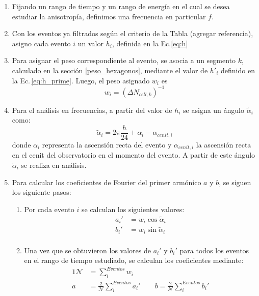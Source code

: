         \begin{enumerate}
        \item Fijando un rango de tiempo y un rango de energía en el cual se desea estudiar la anisotropía, definimos  una frecuencia en particular $f$.

        \item Con los eventos ya filtrados según el criterio de la Tabla (agregar referencia), asigno cada evento $i$ un valor $h_i$, definida en la Ec.\ref{eq:h}

        \item Para asignar el peso correspondiente al evento, se asocia a un segmento $k$, calculado en la sección  \ref{peso_hexagonos}, mediante el valor de $h'_i$ definido en la Ec.\,\ref{eq:h_prime}. Luego, el peso asignado $w_i$ es
        \begin{equation*}
           w_{i}= (\Delta N_{cell,k})^{-1}
        \end{equation*} 
         
        \item Para el análisis en frecuencias, a partir del valor de $h_i$ se asigna un ángulo $\tilde{\alpha}_i$ como:
        \begin{equation}
         \tilde{\alpha}_i = 2\pi \frac{h}{24} + \alpha_i -\alpha_{cenit,i}
        \end{equation}
        donde $\alpha_i$  representa la ascensión recta del evento y $\alpha_{cenit,i}$ la ascensión recta en el cenit del observatorio en el momento del evento. A partir de este ángulo $\tilde{\alpha}_i$ se realiza en análisis.

         \item Para calcular los coeficientes de Fourier del primer armónico $a$ y $b$, se siguen los siguiente pasos:

        \begin{enumerate}
          \item Por cada evento  $i$ se calculan los siguientes valores:
          \begin{align}
             a_i' &= {w_i}\cos\tilde{\alpha}_i\\
             b_i' &= {w_i}\sin\tilde{\alpha}_i\\
         \end{align}
         
         \item Una vez que se obtuvieron los valores de $a_i'$ y $b_i'$ para todos los eventos en el rango de tiempo estudiado, se calculan los coeficientes mediante:
         \begin{alignat}{1}
          \mathcal{N} &= \sum^{Eventos}_i w_i\\ 
            a &= \frac{2}{\mathcal{N}} \sum^{Eventos}_i a_i' \qquad
            b = \frac{2}{\mathcal{N}} \sum^{Eventos}_i b_i'  
         \end{alignat}
        \end{enumerate}


\end{enumerate}
